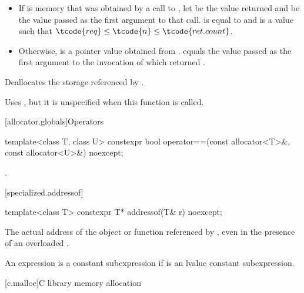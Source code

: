 \begin{itemdescr}
\pnum
\expects
\begin{itemize}
\item
If  is memory that was obtained by a call to ,
let  be the value returned and
 be the value passed as the first argument to that call.
 is equal to  and
 is a value such that $\tcode{req} \leq \tcode{n} \leq \tcode{ret.count}$.
\item
Otherwise,  is a pointer value obtained from .
 equals the value passed as the first argument
to the invocation of  which returned .
\end{itemize}

\pnum
\effects
Deallocates the storage referenced by .

\pnum
\remarks
Uses
,
but it is unspecified
when this function is called.
\end{itemdescr}

[allocator.globals]{Operators}

%
\begin{itemdecl}
template<class T, class U>
  constexpr bool operator==(const allocator<T>&, const allocator<U>&) noexcept;
\end{itemdecl}

\begin{itemdescr}
\pnum
\returns
{}.
\end{itemdescr}

[specialized.addressof]{}

%
\begin{itemdecl}
template<class T> constexpr T* addressof(T& r) noexcept;
\end{itemdecl}

\begin{itemdescr}
\pnum
\returns
The actual address of the object or function referenced by , even in the
presence of an overloaded .

\pnum
\remarks
An expression 
is a constant subexpression
if  is an lvalue constant subexpression.
\end{itemdescr}

[c.malloc]{C library memory allocation}

